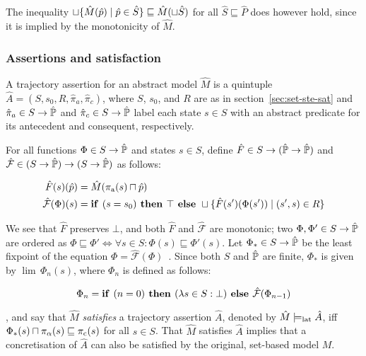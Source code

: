 \noindent The inequality $\sqcup \{ \hat M(\hat p) \mid \hat p \in \hat S \} \sqsubseteq \hat M(\sqcup \hat S)$ for all $\hat S \sqsubseteq \hat P$ does however hold, since it is implied by the monotonicity of $\hat M$.

\subsubsection{Assertions and satisfaction} \label{sec:lat-ste-sat}

A trajectory assertion for an abstract model $\hat M$ is a quintuple $\hat{A} = (S, s_{0}, R, \hat{\pi}_{a}, \hat{\pi}_{c})$, where $S$, $s_{0}$, and $R$ are as in section~\ref{sec:set-ste-sat} and $\hat{\pi}_{a} \in S \rightarrow \hat{\mathbb{P}}$ and $\hat{\pi}_{c} \in S \rightarrow \hat{\mathbb{P}}$ label each state $s \in S$ with an abstract predicate for its antecedent and consequent, respectively. 

For all functions $\Phi \in S \rightarrow \hat{\mathbb{P}}$ and states $s \in S$, define $\hat F \in S \rightarrow (\hat{\mathbb{P}} \rightarrow \hat{\mathbb{P}})$ and $\hat{\mathcal{F}} \in (S \rightarrow \hat{\mathbb{P}}) \rightarrow (S \rightarrow \hat{\mathbb{P}})$ as follows:

\begin{align}
\hat F(s)(\hat p) &= \hat M(\operatorname{\pi_{\textrm{a}}}(s) \sqcap \hat p) \\
\hat{\mathcal{F}}(\Phi)(s) &= \textrm{\textbf{if }} (s = s_{0}) \textrm{\textbf{ then }} \top \textrm{\textbf{ else }} \sqcup \{ \hat F(s')(\Phi(s')) \mid (s',s) \in R \}
\end{align}

\noindent We see that $\hat F$ preserves $\bot$, and both $\hat F$ and $\hat{\mathcal{F}}$ are monotonic; two $\Phi, \Phi' \in S \rightarrow \hat{\mathbb{P}}$ are ordered as $\Phi \sqsubseteq \Phi' \iff \forall s \in S : \Phi(s) \sqsubseteq \Phi'(s)$. Let $\Phi_{*} \in S \rightarrow \hat{\mathbb{P}}$ be the least fixpoint of the equation $\Phi = \hat{\mathcal{F}}(\Phi)$~\cite{davey2002}. Since both $S$ and $\hat{\mathbb{P}}$ are finite, $\Phi_{*}$ is given by $\lim \, \Phi_{n}(s)$, where $\Phi_{n}$ is defined as follows:

\begin{equation}
\Phi_{n} = \textrm{\textbf{if }} (n = 0) \textrm{\textbf{ then }} (\lambda s \in S : \bot) \textrm{\textbf{ else }} \hat{\mathcal{F}}(\Phi_{n-1})
\end{equation}

\noindent {}, and say that $\hat M$ \textit{satisfies} a trajectory assertion $\hat{A}$, denoted by $\hat M \models_{\textrm{lat}} \hat{A}$, iff $\Phi_{*}(s) \sqcap \pi_{\alpha}(s) \sqsubseteq \operatorname{\pi_{\textrm{c}}}(s)$ for all $s \in S$. That $\hat M$ satisfies $\hat{A}$ implies that a concretisation of $\hat{A}$ can also be satisfied by the original, set-based model $M$.

